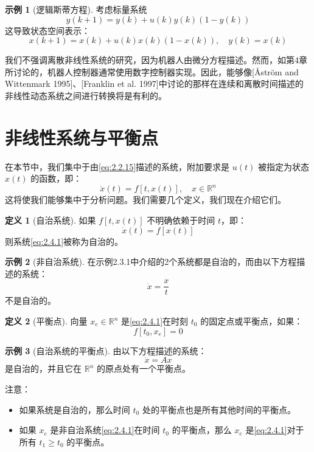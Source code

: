 \documentclass[UTF8,12pt,a4paper]{ctexart}
\theoremstyle{definition}
\newtheorem{definition}{定义}[section]
\newtheorem{example}{示例}[section]
\begin{document}
\begin{example}[逻辑斯蒂方程]
考虑标量系统
\[
y(k+1) = y(k) + u(k)y(k)(1-y(k))
\]
这导致状态空间表示：
\[
x(k+1) = x(k) + u(k)x(k)(1-x(k)), \quad y(k) = x(k)
\]
\end{example}

我们不强调离散非线性系统的研究，因为机器人由微分方程描述。然而，如第4章所讨论的，机器人控制器通常使用数字控制器实现。因此，能够像[Åström and Wittenmark 1995]、[Franklin et al. 1997]中讨论的那样在连续和离散时间描述的非线性动态系统之间进行转换将是有利的。

\section{非线性系统与平衡点}

在本节中，我们集中于由\eqref{eq:2.2.15}描述的系统，附加要求是 $u(t)$ 被指定为状态 $x(t)$ 的函数，即：
\begin{equation}\label{eq:2.4.1}
\dot{x}(t) = f[t, x(t)], \quad x \in \mathbb{R}^n
\end{equation}
这将使我们能够集中于分析问题。我们需要几个定义，我们现在介绍它们。

\begin{definition}[自治系统]
如果 $f[t, x(t)]$ 不明确依赖于时间 $t$，即：
\[
\dot{x}(t) = f[x(t)]
\]
则系统\eqref{eq:2.4.1}被称为自治的。
\end{definition}

\begin{example}[非自治系统]
在示例2.3.1中介绍的2个系统都是自治的，而由以下方程描述的系统：
\[
\dot{x} = \frac{x}{t}
\]
不是自治的。
\end{example}

\begin{definition}[平衡点]
向量 $x_e \in \mathbb{R}^n$ 是\eqref{eq:2.4.1}在时刻 $t_0$ 的固定点或平衡点，如果：
\[
f[t_0, x_e] = 0
\]
\end{definition}

\begin{example}[自治系统的平衡点]
由以下方程描述的系统：
\[
\dot{x} = Ax
\]
是自治的，并且它在 $\mathbb{R}^n$ 的原点处有一个平衡点。
\end{example}

注意：
\begin{itemize}
\item 如果系统是自治的，那么时间 $t_0$ 处的平衡点也是所有其他时间的平衡点。
\item 如果 $x_e$ 是非自治系统\eqref{eq:2.4.1}在时间 $t_0$ 的平衡点，那么 $x_e$ 是\eqref{eq:2.4.1}对于所有 $t_1 \geq t_0$ 的平衡点。
\end{itemize}
\end{document}
